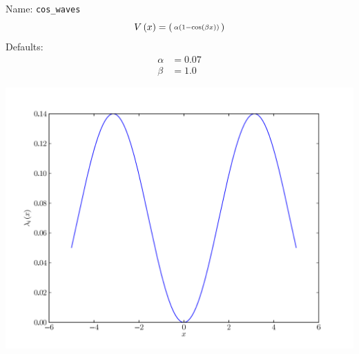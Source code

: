 \documentclass[a4paper,10pt]{report}
\begin{document}
\begin{minipage}{0.5\linewidth}
  Name:    \texttt{cos\_waves}
  \begin{equation*}
    V\left( x \right) = \left(\begin{smallmatrix}\alpha \left(1 - \operatorname{cos}\left(\beta x\right)\right)\end{smallmatrix}\right)
  \end{equation*}
  Defaults:
  \begin{align*}
    \alpha &= 0.07 \\
    \beta &= 1.0
  \end{align*}
\end{minipage}
\begin{minipage}{0.5\linewidth}
  \begin{center}
    \includegraphics[scale=0.25]{./fig/cos_waves.pdf}
  \end{center}
\end{minipage}
\end{document}
